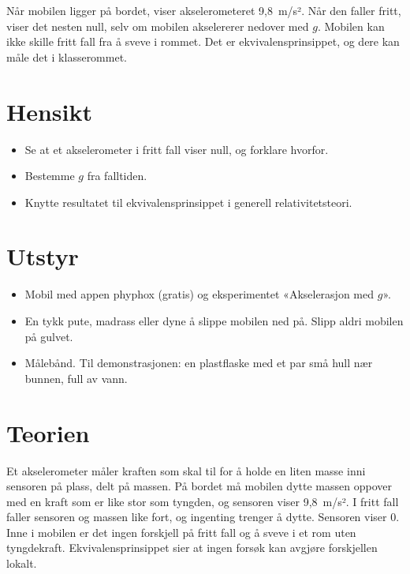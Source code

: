 \documentclass[11pt]{article}
\begin{document}

Når mobilen ligger på bordet, viser akselerometeret 9,8~m/s². Når den faller fritt, viser det nesten null, selv om mobilen akselererer nedover med $g$. Mobilen kan ikke skille fritt fall fra å sveve i rommet. Det er ekvivalensprinsippet, og dere kan måle det i klasserommet.

\section*{Hensikt}

\begin{itemize}
\item Se at et akselerometer i fritt fall viser null, og forklare hvorfor.
\item Bestemme $g$ fra falltiden.
\item Knytte resultatet til ekvivalensprinsippet i generell relativitetsteori.
\end{itemize}

\section*{Utstyr}

\begin{itemize}
\item Mobil med appen phyphox (gratis) og eksperimentet «Akselerasjon med $g$».
\item En tykk pute, madrass eller dyne å slippe mobilen ned på. Slipp aldri mobilen på gulvet.
\item Målebånd. Til demonstrasjonen: en plastflaske med et par små hull nær bunnen, full av vann.
\end{itemize}

\section*{Teorien}

Et akselerometer måler kraften som skal til for å holde en liten masse inni sensoren på plass, delt på massen. På bordet må mobilen dytte massen oppover med en kraft som er like stor som tyngden, og sensoren viser 9,8~m/s². I fritt fall faller sensoren og massen like fort, og ingenting trenger å dytte. Sensoren viser 0. Inne i mobilen er det ingen forskjell på fritt fall og å sveve i et rom uten tyngdekraft. Ekvivalensprinsippet sier at ingen forsøk kan avgjøre forskjellen lokalt.
\end{document}
